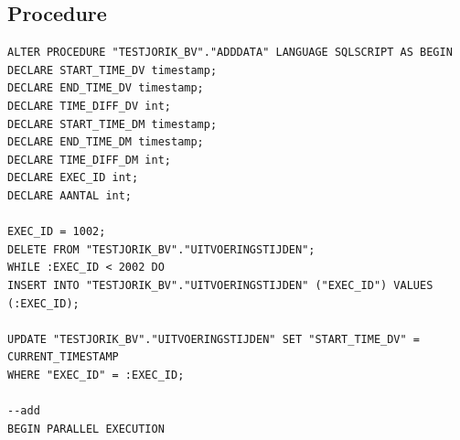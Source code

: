 \subsection{Procedure} 
\begin{lstlisting}[frame=single] 
ALTER PROCEDURE "TESTJORIK_BV"."ADDDATA" LANGUAGE SQLSCRIPT AS BEGIN
DECLARE START_TIME_DV timestamp;
DECLARE END_TIME_DV timestamp;
DECLARE TIME_DIFF_DV int;
DECLARE START_TIME_DM timestamp;
DECLARE END_TIME_DM timestamp;
DECLARE TIME_DIFF_DM int;
DECLARE EXEC_ID int;
DECLARE AANTAL int;

EXEC_ID = 1002;
DELETE FROM "TESTJORIK_BV"."UITVOERINGSTIJDEN";
WHILE :EXEC_ID < 2002 DO
INSERT INTO "TESTJORIK_BV"."UITVOERINGSTIJDEN" ("EXEC_ID") VALUES (:EXEC_ID);

UPDATE "TESTJORIK_BV"."UITVOERINGSTIJDEN" SET "START_TIME_DV" = CURRENT_TIMESTAMP
WHERE "EXEC_ID" = :EXEC_ID;

--add
BEGIN PARALLEL EXECUTION


\end{lstlisting}
